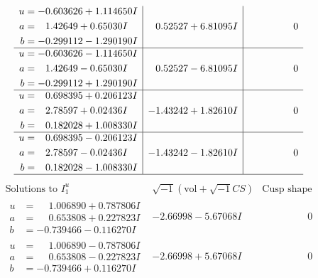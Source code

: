 \documentclass[1p]{elsarticle_modified}
\theoremstyle{definition}
\newcommand{\I}{\sqrt{-1}}
\begin{document}
$$\begin{array}{c|c|c}
\begin{aligned}
u &= -0.603626 + 1.114650 I \\
a &= \phantom{-}1.42649 + 0.65030 I \\
b &= -0.299112 - 1.290190 I\end{aligned}
 & \phantom{-}0.52527 + 6.81095 I & \phantom{-0.000000 } 0 \\ \hline\begin{aligned}
u &= -0.603626 - 1.114650 I \\
a &= \phantom{-}1.42649 - 0.65030 I \\
b &= -0.299112 + 1.290190 I\end{aligned}
 & \phantom{-}0.52527 - 6.81095 I & \phantom{-0.000000 } 0 \\ \hline\begin{aligned}
u &= \phantom{-}0.698395 + 0.206123 I \\
a &= \phantom{-}2.78597 + 0.02436 I \\
b &= \phantom{-}0.182028 + 1.008330 I\end{aligned}
 & -1.43242 + 1.82610 I & \phantom{-0.000000 } 0 \\ \hline\begin{aligned}
u &= \phantom{-}0.698395 - 0.206123 I \\
a &= \phantom{-}2.78597 - 0.02436 I \\
b &= \phantom{-}0.182028 - 1.008330 I\end{aligned}
 & -1.43242 - 1.82610 I & \phantom{-0.000000 } 0\\
 \hline 
 \end{array}$$\newpage$$\begin{array}{c|c|c}  
\text{Solutions to }I^u_{1}& \I (\text{vol} + \sqrt{-1}CS) & \text{Cusp shape}\\
 \hline 
\begin{aligned}
u &= \phantom{-}1.006890 + 0.787806 I \\
a &= \phantom{-}0.653808 + 0.227823 I \\
b &= -0.739466 - 0.116270 I\end{aligned}
 & -2.66998 - 5.67068 I & \phantom{-0.000000 } 0 \\ \hline\begin{aligned}
u &= \phantom{-}1.006890 - 0.787806 I \\
a &= \phantom{-}0.653808 - 0.227823 I \\
b &= -0.739466 + 0.116270 I\end{aligned}
 & -2.66998 + 5.67068 I & \phantom{-0.000000 } 0 \\ \hline\begin{aligned}

\end{aligned}
\end{array}$$
\end{document}
